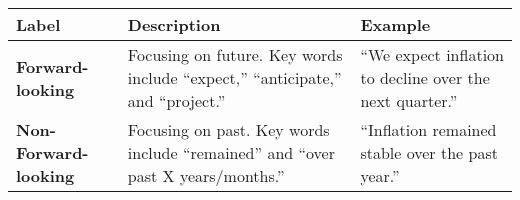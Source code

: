 \begin{table*}
    \caption{}
    \vspace{1em}
    \begin{tabular}{p{}p{}p{}}
    \toprule
    \textbf{Label} & \textbf{Description} & \textbf{Example}\\
    \midrule
    \textbf{Forward-looking} & Focusing on future. Key words include “expect,” “anticipate,” and “project.” & “We expect inflation to decline over the next quarter.”\\
    \midrule
    \textbf{Non-Forward-looking} & Focusing on past. Key words include “remained” and “over past X years/months.” & “Inflation remained stable over the past year.”\\
    \bottomrule
    \end{tabular}
    \label{tb:bom_forward_looking_guide}
    \end{table*}